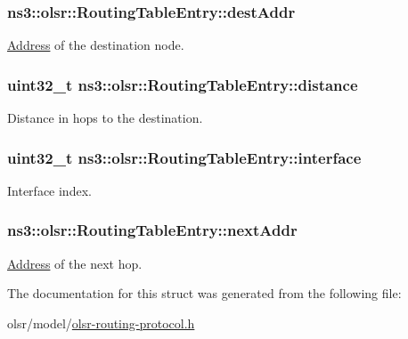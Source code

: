 \subsubsection[{\texorpdfstring{dest\+Addr}{destAddr}}]{ ns3\+::olsr\+::\+Routing\+Table\+Entry\+::dest\+Addr}\hypertarget{structns3_1_1olsr_1_1RoutingTableEntry_af27e6b47a959c82c6066826046a9db73}{}\label{structns3_1_1olsr_1_1RoutingTableEntry_af27e6b47a959c82c6066826046a9db73}


\hyperlink{classns3_1_1Address}{Address} of the destination node. 

\subsubsection[{\texorpdfstring{distance}{distance}}]{\setlength{\rightskip}{0pt plus 5cm}uint32\+\_\+t ns3\+::olsr\+::\+Routing\+Table\+Entry\+::distance}\hypertarget{structns3_1_1olsr_1_1RoutingTableEntry_a346f3c48ef17128a0b0a9f97398e497b}{}\label{structns3_1_1olsr_1_1RoutingTableEntry_a346f3c48ef17128a0b0a9f97398e497b}


Distance in hops to the destination. 

\subsubsection[{\texorpdfstring{interface}{interface}}]{\setlength{\rightskip}{0pt plus 5cm}uint32\+\_\+t ns3\+::olsr\+::\+Routing\+Table\+Entry\+::interface}\hypertarget{structns3_1_1olsr_1_1RoutingTableEntry_ab644bb20e4bd9d5be0d28ed8e107ff6c}{}\label{structns3_1_1olsr_1_1RoutingTableEntry_ab644bb20e4bd9d5be0d28ed8e107ff6c}


Interface index. 

\subsubsection[{\texorpdfstring{next\+Addr}{nextAddr}}]{ ns3\+::olsr\+::\+Routing\+Table\+Entry\+::next\+Addr}\hypertarget{structns3_1_1olsr_1_1RoutingTableEntry_aa22120ed9301ffc9cd49c782cf4ecf9a}{}\label{structns3_1_1olsr_1_1RoutingTableEntry_aa22120ed9301ffc9cd49c782cf4ecf9a}


\hyperlink{classns3_1_1Address}{Address} of the next hop. 



The documentation for this struct was generated from the following file\+:\begin{DoxyCompactItemize}
\item 
olsr/model/\hyperlink{olsr-routing-protocol_8h}{olsr-\/routing-\/protocol.\+h}\end{DoxyCompactItemize}
